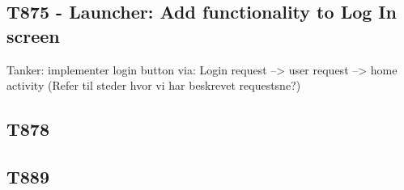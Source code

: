 \subsection{T875 - Launcher: Add functionality to Log In screen}

Tanker:
implementer login button via:
Login request --> user request --> home activity
(Refer til steder hvor vi har beskrevet requestsne?)


\subsection{T878}

\subsection{T889}


